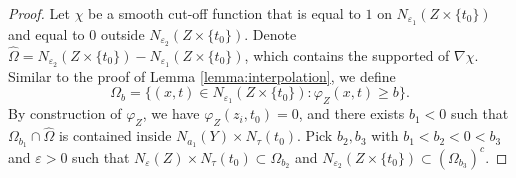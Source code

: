 \documentclass[12pt, reqno]{amsart}
\theoremstyle{plain}%
\theoremstyle{definition}
\theoremstyle{remark}
\numberwithin{equation}{section}
\begin{document}
\begin{proof}
	Let $\chi$ be a smooth cut-off function that is equal to $1$ on $N_{\varepsilon_1}(Z\times\{t_0\})$ and equal to $0$ outside $N_{\varepsilon_2}(Z\times\{t_0\})$. Denote $\widehat\Omega=N_{\varepsilon_2}(Z\times\{t_0\})-N_{\varepsilon_1}(Z\times\{t_0\})$, which contains the supported of $\nabla\chi$.
	Similar to the proof of Lemma \ref{lemma:interpolation}, we define
	$$\Omega_b=\{(x,t)\in N_{\varepsilon_1}(Z\times\{t_0\}):\varphi_Z(x,t)\geq b\}.$$
	By construction of $\varphi_Z$, we have $\varphi_Z(z_i,t_0)=0$, and there exists $b_1<0$ such that $\Omega_{b_1}\cap\widehat\Omega$ is contained inside $N_{a_1}(Y)\times N_\tau(t_0)$. Pick $b_2,b_3$ with $b_1<b_2<0<b_3$ and $\varepsilon>0$ such that $N_\varepsilon(Z)\times N_\tau(t_0)\subset \Omega_{b_2}$ and $N_{\varepsilon_2}(Z\times\{t_0\})\subset (\Omega_{b_3})^c$. 
	

\end{proof}
\end{document}
